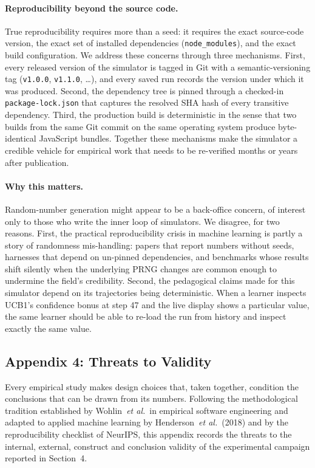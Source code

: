\paragraph{Reproducibility beyond the source code.}
True reproducibility requires more than a seed: it requires the exact source-code version, the exact set of installed dependencies (\texttt{node\_modules}), and the exact build configuration. We address these concerns through three mechanisms. First, every released version of the simulator is tagged in Git with a semantic-versioning tag (\texttt{v1.0.0}, \texttt{v1.1.0}, \ldots), and every saved run records the version under which it was produced. Second, the dependency tree is pinned through a checked-in \texttt{package-lock.json} that captures the resolved SHA hash of every transitive dependency. Third, the production build is deterministic in the sense that two builds from the same Git commit on the same operating system produce byte-identical JavaScript bundles. Together these mechanisms make the simulator a credible vehicle for empirical work that needs to be re-verified months or years after publication.

\paragraph{Why this matters.}
Random-number generation might appear to be a back-office concern, of interest only to those who write the inner loop of simulators. We disagree, for two reasons. First, the practical reproducibility crisis in machine learning is partly a story of randomness mis-handling: papers that report numbers without seeds, harnesses that depend on un-pinned dependencies, and benchmarks whose results shift silently when the underlying PRNG changes are common enough to undermine the field's credibility. Second, the pedagogical claims made for this simulator depend on its trajectories being deterministic. When a learner inspects UCB1's confidence bonus at step 47 and the live display shows a particular value, the same learner should be able to re-load the run from history and inspect exactly the same value.

\subsection*{Appendix 4: Threats to Validity}
Every empirical study makes design choices that, taken together, condition the conclusions that can be drawn from its numbers. Following the methodological tradition established by Wohlin~\emph{et al.}\ in empirical software engineering and adapted to applied machine learning by Henderson~\emph{et al.}\ (2018) and by the reproducibility checklist of NeurIPS, this appendix records the threats to the internal, external, construct and conclusion validity of the experimental campaign reported in Section~4.

